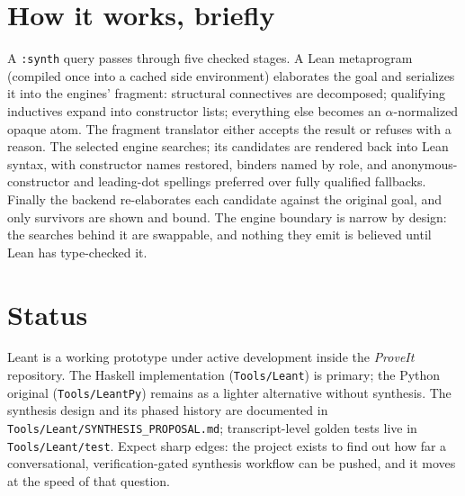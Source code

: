 \documentclass[11pt,oneside]{article}
\newcommand{\code}[1]{\texttt{#1}}
\begin{document}
\section{How it works, briefly}\label{sec:how}

A \code{:synth} query passes through five checked stages. A Lean
metaprogram (compiled once into a cached side environment) elaborates
the goal and serializes it into the engines' fragment: structural
connectives are decomposed; qualifying inductives expand into
constructor lists; everything else becomes an $\alpha$-normalized
opaque atom. The fragment translator either accepts the result or
refuses with a reason. The selected engine searches; its candidates
are rendered back into Lean syntax, with constructor names restored,
binders named by role, and anonymous-constructor and leading-dot
spellings preferred over fully qualified fallbacks. Finally the
backend re-elaborates each candidate against the original goal, and
only survivors are shown and bound. The engine boundary is narrow by
design: the searches behind it are swappable, and nothing they emit is
believed until Lean has type-checked it.

\section{Status}\label{sec:status}

Leant is a working prototype under active development inside the
\emph{ProveIt} repository. The Haskell implementation
(\code{Tools/Leant}) is primary; the Python original
(\code{Tools/LeantPy}) remains as a lighter alternative without
synthesis. The synthesis design and its phased history are documented
in \code{Tools/Leant/SYNTHESIS\_PROPOSAL.md}; transcript-level golden
tests live in \code{Tools/Leant/test}. Expect sharp edges: the project exists to find out how far a
conversational, verification-gated synthesis workflow can be pushed,
and it moves at the speed of that question.
\end{document}
